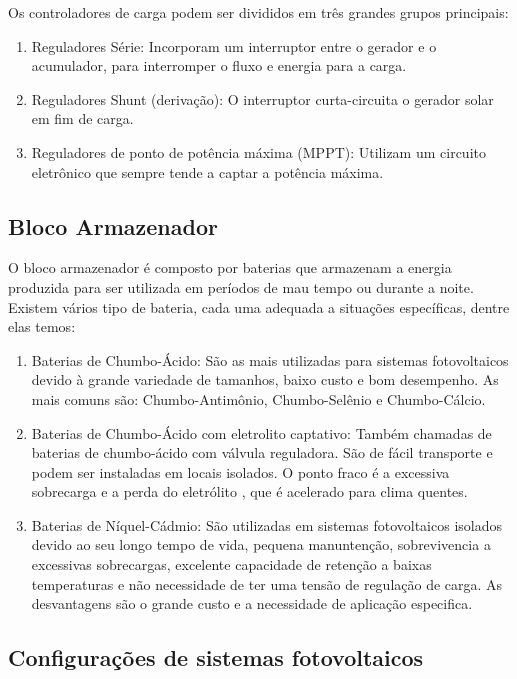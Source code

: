Os controladores de carga podem ser divididos em três grandes grupos principais: 

\begin{enumerate}
    \item Reguladores Série: Incorporam um interruptor entre o gerador e o acumulador, para interromper o fluxo e energia para a carga.
	\item Reguladores Shunt (derivação): O interruptor curta-circuita o gerador solar em fim de carga.
	\item Reguladores de ponto de potência máxima (MPPT): Utilizam um circuito eletrônico que sempre tende a captar a potência máxima. 
\end{enumerate}

\subsection{Bloco Armazenador}

O bloco armazenador é composto por baterias que armazenam a energia produzida para ser utilizada em períodos de mau tempo ou durante a noite. Existem vários tipo de bateria, cada uma adequada a situações específicas, dentre elas temos:

\begin{enumerate}
    \item Baterias de Chumbo-Ácido: São as mais utilizadas para sistemas fotovoltaicos devido à grande variedade de tamanhos, baixo custo e bom desempenho. As mais comuns são: Chumbo-Antimônio, Chumbo-Selênio e Chumbo-Cálcio.
	\item Baterias de Chumbo-Ácido com eletrolito captativo: Também chamadas de baterias de chumbo-ácido com válvula reguladora. São de fácil transporte e podem ser instaladas em locais isolados. O ponto fraco é a excessiva sobrecarga e a perda do eletrólito , que é acelerado para clima quentes.
	\item Baterias de Níquel-Cádmio:  São utilizadas em sistemas fotovoltaicos isolados devido ao seu longo tempo de vida, pequena manuntenção, sobrevivencia a excessivas sobrecargas, excelente capacidade de retenção a baixas temperaturas e não necessidade de ter uma tensão de regulação de carga. As desvantagens são o grande custo e a necessidade de aplicação especifica. 
\end{enumerate}

\subsection{Configurações de sistemas fotovoltaicos}

